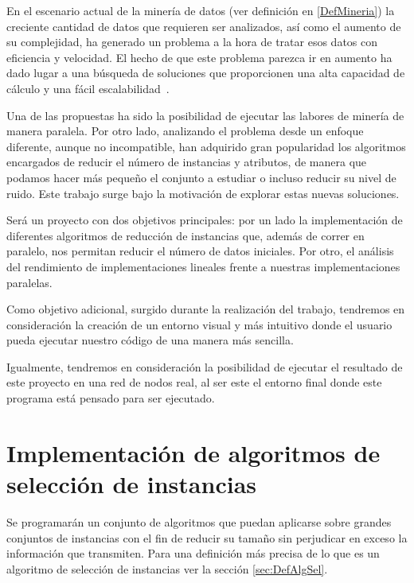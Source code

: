 

En el escenario actual de la minería de datos (ver definición en \ref{DefMineria}) la creciente cantidad de datos que requieren ser analizados, así como el aumento de su complejidad,  ha generado un problema a la hora de tratar esos datos con eficiencia y velocidad. El hecho de que este problema parezca ir en aumento ha dado lugar a una búsqueda de soluciones que proporcionen una alta capacidad de cálculo y una fácil escalabilidad~\cite{DataMiningConcepts}. 

Una de las propuestas ha sido la posibilidad de ejecutar las labores de minería de manera paralela. Por otro lado, analizando el problema desde un enfoque diferente, aunque no incompatible, han adquirido gran popularidad los algoritmos encargados de reducir el número de instancias y atributos, de manera que podamos hacer más pequeño el conjunto a estudiar o incluso reducir su nivel de ruido. Este trabajo surge bajo la motivación de explorar estas nuevas soluciones. 

Será un proyecto con dos objetivos principales: por un lado la implementación de diferentes algoritmos de reducción de instancias que, además de correr en paralelo, nos permitan reducir el número de datos iniciales. Por otro, el análisis del rendimiento de implementaciones lineales frente a nuestras implementaciones paralelas.

Como objetivo adicional, surgido durante la realización del trabajo, tendremos en consideración la creación de un entorno visual y más intuitivo donde el usuario pueda ejecutar nuestro código de una manera más sencilla.

Igualmente, tendremos en consideración la posibilidad de ejecutar el resultado de este proyecto en una red de nodos real, al ser este el entorno final donde este programa está pensado para ser ejecutado.

\section{Implementación de algoritmos de selección de instancias}

Se programarán un conjunto de algoritmos que puedan aplicarse sobre grandes conjuntos de instancias con el fin de reducir su tamaño sin perjudicar en exceso la información que transmiten. Para una definición más precisa de lo que es un algoritmo de selección de instancias ver la sección \ref{sec:DefAlgSel}.

